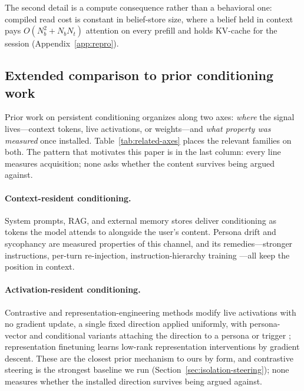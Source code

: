 The second detail is a compute consequence rather than a behavioral one: compiled read cost is
constant in belief-store size, where a belief held in context pays \(O(N_b^2 + N_b N_t)\)
attention on every prefill and holds KV-cache for the session
(Appendix~\ref{app:repro}).\label{sec:mechanism-serving}
\label{sec:mechanism-belieftree}\label{sec:mechanism-modulation}
\label{sec:mechanism-write}\label{sec:mechanism-slot}

\subsection{Extended comparison to prior conditioning work}
\label{app:related-full}
Prior work on persistent conditioning organizes along two axes: \emph{where} the signal
lives---context tokens, live activations, or weights---and \emph{what property was measured}
once installed. Table~\ref{tab:related-axes} places the relevant families on both. The
pattern that motivates this paper is in the last column: every line measures acquisition;
none asks whether the content survives being argued against.

\paragraph{Context-resident conditioning.} System prompts, RAG, and external memory stores
\citep{packer2023memgpt} deliver conditioning as tokens the model attends to alongside the
user's content. Persona drift \citep{choi2024identitydrift, li2024measuring} and sycophancy
\citep{sharma2024towards, perez2022persona} are measured properties of this channel, and its
remedies---stronger instructions, per-turn re-injection, instruction-hierarchy training
\citep{wallace2024instruction}---all keep the position in context.

\paragraph{Activation-resident conditioning.} Contrastive and representation-engineering
methods \citep{turner2023activation, zou2023representation, rimsky2024caa} modify live
activations with no gradient update, a single fixed direction applied uniformly, with
persona-vector and conditional variants attaching the direction to a persona or trigger
\citep{chen2025personavectors}; representation finetuning \citep{wu2024reft} learns low-rank
representation interventions by gradient descent. These are the closest prior mechanism to
ours by form, and contrastive steering is the strongest baseline we run
(Section~\ref{sec:isolation-steering}); none measures whether the installed direction survives
being argued against.

